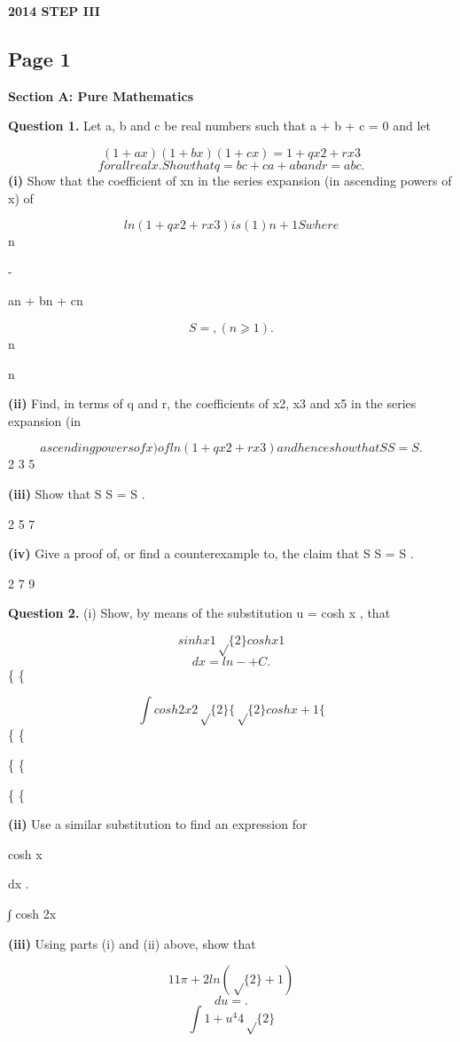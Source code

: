 \documentclass[12pt]{article}
\begin{document}
\begin{center}
{\Large \textbf{2014 STEP III}}
\end{center}

\subsection*{Page 1}
\begin{flushleft}
\bigskip\textbf{Section A: Pure Mathematics}\par
\bigskip\textbf{Question 1.} Let a, b and c be real numbers such that a + b + c = 0 and let\par
\[(1 + ax)(1 + bx)(1 + cx) = 1 + qx2 + rx3\]
\[for all real x. Show that q = bc + ca + ab and r = abc.\]
\textbf{(i)} Show that the coefficient of xn in the series expansion (in ascending powers of x) of\par
\[ln(1 + qx2 + rx3) is ( 1)n+1S where\]
n\par
-\par
an + bn + cn\par
\[S = , (n ⩾ 1).\]
n\par
n\par
\textbf{(ii)} Find, in terms of q and r, the coefficients of x2, x3 and x5 in the series expansion (in\par
\[ascending powers of x) of ln(1 + qx2 + rx3) and hence show that S S = S .\]
2 3 5\par
\textbf{(iii)} Show that S S = S .\par
2 5 7\par
\textbf{(iv)} Give a proof of, or find a counterexample to, the claim that S S = S .\par
2 7 9\par
\bigskip\textbf{Question 2.} (i) Show, by means of the substitution u = cosh x , that\par
\[sinh x 1 \sqrt\{2\} cosh x 1\]
\[dx = ln - + C .\]
\{ \{\par
\[∫ cosh 2x 2\sqrt\{2\} \{ \sqrt\{2\} cosh x + 1 \{\]
\{ \{\par
\{ \{\par
\{ \{\par
\textbf{(ii)} Use a similar substitution to find an expression for\par
cosh x\par
dx .\par
∫ cosh 2x\par
\textbf{(iii)} Using parts (i) and (ii) above, show that\par
\[1 1 \pi + 2 ln(\sqrt\{2\} + 1)\]
\[du = .\]
\[∫ 1 + u^4 4\sqrt\{2\}\]
\end{flushleft}
\end{document}
